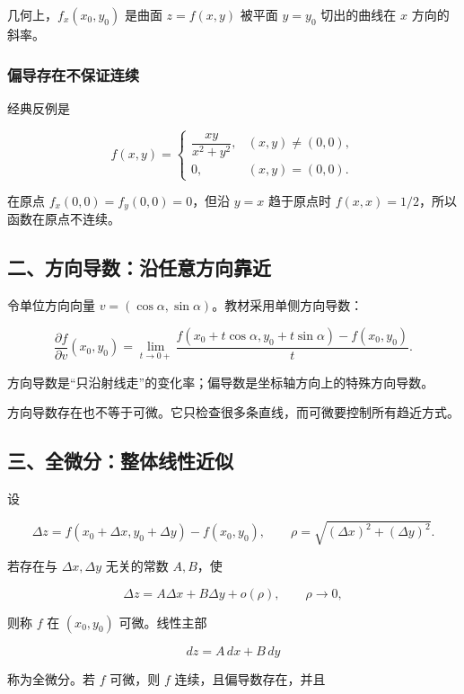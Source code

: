 几何上，\(f_x(x_0,y_0)\) 是曲面 \(z=f(x,y)\) 被平面 \(y=y_0\) 切出的曲线在 \(x\) 方向的斜率。

\subsubsection*{偏导存在不保证连续}

经典反例是

\[
      f(x,y)=
      \begin{cases}
      \dfrac{xy}{x^2+y^2}, & (x,y)\ne(0,0),\\
      0, & (x,y)=(0,0).
      \end{cases}
    \]

在原点 \(f_x(0,0)=f_y(0,0)=0\)，但沿 \(y=x\) 趋于原点时 \(f(x,x)=1/2\)，所以函数在原点不连续。

\subsection*{二、方向导数：沿任意方向靠近}

令单位方向向量 \(v=(\cos\alpha,\sin\alpha)\)。教材采用单侧方向导数：

\[
      \frac{\partial f}{\partial v}(x_0,y_0)=
      \lim_{t\to0+}
      \frac{f(x_0+t\cos\alpha,y_0+t\sin\alpha)-f(x_0,y_0)}{t}.
    \]

方向导数是“只沿射线走”的变化率；偏导数是坐标轴方向上的特殊方向导数。

\begin{notebox}
方向导数存在也不等于可微。它只检查很多条直线，而可微要控制所有趋近方式。
\end{notebox}

\subsection*{三、全微分：整体线性近似}

设

\[
      \Delta z=f(x_0+\Delta x,y_0+\Delta y)-f(x_0,y_0),\qquad
      \rho=\sqrt{(\Delta x)^2+(\Delta y)^2}.
    \]

若存在与 \(\Delta x,\Delta y\) 无关的常数 \(A,B\)，使

\[
      \Delta z=A\Delta x+B\Delta y+o(\rho),
      \qquad \rho\to0,
    \]

则称 \(f\) 在 \((x_0,y_0)\) 可微。线性主部

\[
      dz=A\,dx+B\,dy
    \]

称为全微分。若 \(f\) 可微，则 \(f\) 连续，且偏导数存在，并且

